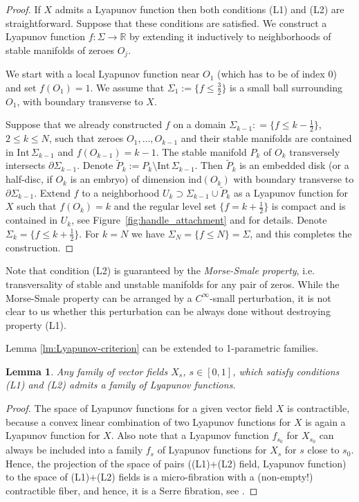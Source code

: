 \documentclass[12pt]{amsart}
\theoremstyle{plain}
\newtheorem{lemma}[theorem]{Lemma}
\theoremstyle{definition}
\theoremstyle{remark}
\newcommand{\R}{\mathbb{R}}
\newcommand{\p}{\partial}
\newcommand{\wt}{\widetilde}
\newcommand{\Int}{\mathrm{Int\,}}
\newcommand{\ind}{\mathrm{ind}}
\begin{document}
  \begin{proof} 
  If $X$ admits a Lyapunov function then both conditions (L1)  and (L2) are straightforward. Suppose that these conditions are satisfied.
We construct    a Lyapunov function  $f:\Sigma\to\R$ by extending it inductively to neighborhoods of stable manifolds of zeroes $O_j$.
 
We start with a local Lyapunov function near $O_1$ (which has to be of index $0$)  and    set     $f(O_1)=1$.   We assume  that $\Sigma_1:=\{f\leq \frac32\}$  is a small ball surrounding $O_1$, with boundary transverse to $X$.
 
Suppose that  we already constructed   $f$  on a domain $\Sigma_{k-1}: =\{f\leq k-\frac12\}$, $2\leq k\leq N$,   such that    zeroes $O_1,\dots, O_{k-1}$  and their stable manifolds  are contained in  $\Int\Sigma_{k-1}$ and $f(O_{k-1})=k-1$.  
The stable manifold   $P_k$  of $O_k$  transversely intersects $\p\Sigma_{k-1}$. Denote    $\wt P_k:=P_k\setminus\Int\Sigma_{k-1}$. Then  $\wt P_k$ is  an embedded disk (or  a half-disc, if $O_k$ is an embryo) of dimension $\ind(O_k)$ with boundary transverse to $\p\Sigma_{k-1}$. Extend     $f$    to a neighborhood $U_k\supset \Sigma_{k-1}\cup \wt P_k$  as a   Lyapunov function  for $X$ such that   $f(O_k)=k $  and the regular level set $\{f=k+\frac12\}$ is compact and  is contained in $U_k$, see  Figure~\ref{fig:handle_attachment} and \cite{CE12} for details. Denote $\Sigma_k = \{f\leq k+\frac12\}$. For $k=N$ we have $\Sigma_N= \{f\leq N \}=\Sigma$, and this completes the construction.  
\end{proof}
 
Note that condition (L2) is guaranteed by the  {\em Morse-Smale property}, i.e. transversality of stable and unstable manifolds for any pair of zeros. While  the Morse-Smale property can be arranged by a $C^\infty$-small perturbation, it is not clear to us whether this perturbation can be always done without destroying property (L1).
 

Lemma \ref{lm:Lyapunov-criterion} can be extended to 1-parametric families.
\begin{lemma}\label{lm:Lyapunov-criterion-param} Any family of vector 
fields $X_s$, $s\in[0,1]$, which satisfy conditions (L1) and (L2) admits a family  of    Lyapunov functions.
\end{lemma}
 \begin{proof} The space of Lyapunov functions for a given vector field $X$ is contractible,  because  a  convex linear combination of two Lyapunov functions for $X$ is again a Lyapunov function for $X$.   Also note that a Lyapunov  function $f_{s_0}$ for $X_{s_0}$  can  always be included into a family $f_s$ of   Lyapunov functions for $X_s$ for $s$ close to $s_0$.  Hence, the projection of the space of pairs  ((L1)+(L2) field,  Lyapunov function) to the space of (L1)+(L2)  fields is a micro-fibration with  a (non-empty!) contractible fiber, and hence, it is a Serre fibration, see \cite{Gro86, We05}.
 \end{proof} 
\end{document}
